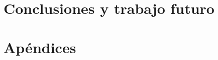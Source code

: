 \documentclass{ugrTFG}
\begin{document}
\cleardoublepage
\part{Conclusiones y trabajo futuro}\label{part:conclusiones}


\appendix %
\cleardoublepage
\part{Apéndices}\label{part:apendices}






\backmatter %



\begin{small}
  
  \label{sec:bibliography}
\end{small}
\end{document}
